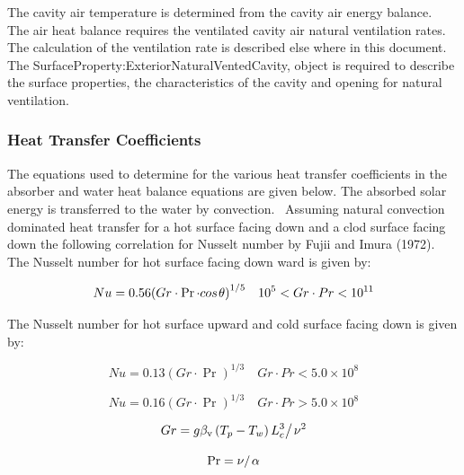 The cavity air temperature is determined from the cavity air energy balance.~ The air heat balance requires the ventilated cavity air natural ventilation rates.~ The calculation of the ventilation rate is described else where in this document. The SurfaceProperty:ExteriorNaturalVentedCavity, object is required to describe the surface properties, the characteristics of the cavity and opening for natural ventilation.

\subsubsection{Heat Transfer Coefficients}\label{heat-transfer-coefficients}

The equations used to determine for the various heat transfer coefficients in the absorber and water heat balance equations are given below. The absorbed solar energy is transferred to the water by convection.~ Assuming natural convection dominated heat transfer for a hot surface facing down and a clod surface facing down the following correlation for Nusselt number by Fujii and Imura (1972).~ The Nusselt number for hot surface facing down ward is given by:

\begin{equation}
Nu = 0.56{\left( {Gr \cdot \Pr  \cdot cos{\kern 1pt} \theta } \right)^{1/5}}\quad {10^5} < Gr \cdot Pr < {10^{11}}
\end{equation}

The Nusselt number for hot surface upward and cold surface facing down is given by:

\begin{equation}
Nu = 0.13{\left( {Gr \cdot \Pr } \right)^{1/3}}\quad Gr \cdot Pr < 5.0 \times {10^8}
\end{equation}

\begin{equation}
Nu = 0.16{\left( {Gr \cdot \Pr } \right)^{1/3}}\quad Gr \cdot Pr > 5.0 \times {10^8}
\end{equation}

\begin{equation}
Gr = {{g{\beta_{\rm{v}}}\left( {{T_p} - {T_w}} \right)L_c^3} \mathord{\left/ {\vphantom {{g{\beta_{\rm{v}}}\left( {{T_p} - {T_w}} \right)L_c^3} {{\nu ^2}}}} \right. } {{\nu ^2}}}
\end{equation}

\begin{equation}
\Pr  = {\nu  \mathord{\left/ {\vphantom {\nu  \alpha }} \right. } \alpha }
\end{equation}

